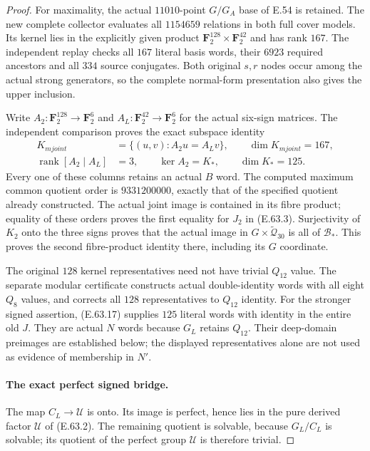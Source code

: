 \begin{proof}
For maximality, the actual $11010$-point $G/G_A$
base of E.54 is retained. The new complete collector
evaluates all $1154659$ relations in both full cover
models. Its kernel lies in the explicitly given
product $\mathbf F_2^{128}\times\mathbf F_2^{42}$
and has rank $167$. The independent replay checks
all $167$ literal basis words, their $6923$ required
ancestors and all $334$ source conjugates. Both
original $s,r$ nodes occur among the actual strong
generators, so the complete normal-form presentation
also gives the upper inclusion.

Write $A_2:\mathbf F_2^{128}\to\mathbf F_2^6$ and
$A_L:\mathbf F_2^{42}\to\mathbf F_2^6$ for the
actual six-sign matrices. The independent comparison
proves the exact subspace identity
\[
 \begin{split}
 K_{
m joint}
    &=\{(u,v):A_2u=A_Lv\},\qquad\dim K_{
m joint}=167,\\
 \operatorname{rank}[A_2\mid A_L]&=3,
       \qquad\ker A_2=K_*,\qquad\dim K_*=125.
 \end{split}
 \tag{E.63.17}
\]
Every one of these columns retains an actual $B$ word.
The computed maximum common quotient order is
$9331200000$, exactly that of the specified quotient
already constructed. The actual joint image is
contained in its fibre product; equality of these
orders proves the first equality for $J_2$ in
\textup{(E.63.3)}. Surjectivity of $K_2$ onto the
three signs proves that the actual image in
$G\times\widetilde{\mathcal Q}_{30}$ is all of
$\mathcal B_*$. This proves the second fibre-product
identity there, including its $G$ coordinate.

The original $128$ kernel representatives need not
have trivial $Q_{12}$ value. The separate modular
certificate constructs actual double-identity words
with all eight $Q_8$ values, and corrects all $128$
representatives to $Q_{12}$ identity. For the stronger
signed assertion, \textup{(E.63.17)} supplies $125$
literal words with identity in the entire old $J$.
They are actual $N$ words because $G_L$ retains
$Q_{12}$. Their deep-domain preimages are established
below; the displayed representatives alone are not
used as evidence of membership in $N'$.

\paragraph{The exact perfect signed bridge.}
The map $C_L\to\mathcal U$ is onto. Its image is
perfect, hence lies in the pure derived factor
$\mathcal U$ of \textup{(E.63.2)}. The remaining
quotient is solvable, because $G_L/C_L$ is solvable;
its quotient of the perfect group $\mathcal U$ is
therefore trivial.


\end{proof}
